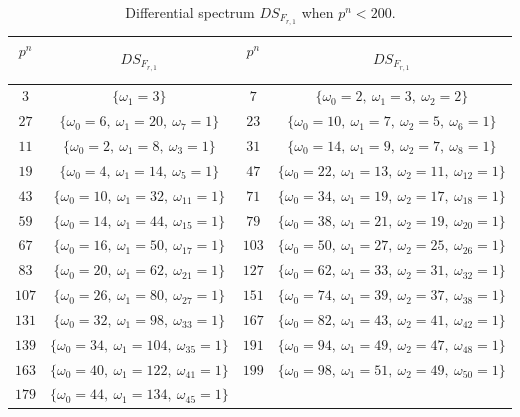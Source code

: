 \documentclass[11pt]{article}
\numberwithin{theorem}{section}
\begin{document}
\begin{table}
	\begin{center}
	\begin{tabular}{cc|cc}
		\hline $p^n$\ & $DS_{F_{r,1}}$ &  $p^n$\ & $DS_{F_{r,1}}$ \\
		\hline $3$ & $\{ \omega_1 = 3 \}$ & $7$ & $\{\omega_0 = 2,\ \omega_1 = 3,\ \omega_2 = 2 \}$\\
		$27$ & $\{\omega_0 = 6,\ \omega_1 = 20,\ \omega_7 = 1 \}$ & $23$ & $\{\omega_0 = 10,\ \omega_1 = 7,\ \omega_2 = 5,\ \omega_{6}=1 \}$ \\
		$11$ & $\{\omega_0 = 2,\ \omega_1 = 8,\ \omega_3 = 1 \}$ & $31$ & $\{\omega_0 = 14,\ \omega_1 = 9,\ \omega_2 = 7,\ \omega_{8}=1 \}$ \\
		$19$ & $\{\omega_0 = 4,\ \omega_1 = 14,\ \omega_5 = 1 \}$ & $47$ & $\{\omega_0 = 22,\ \omega_1 = 13,\ \omega_2 = 11,\ \omega_{12}=1 \}$ \\
		$43$ & $\{\omega_0 = 10,\ \omega_1 = 32,\ \omega_{11} = 1 \}$ & $71$ & $\{\omega_0 = 34,\ \omega_1 = 19,\ \omega_2 = 17,\ \omega_{18}=1 \}$ \\
		$59$ & $\{\omega_0 = 14,\ \omega_1 = 44,\ \omega_{15} = 1 \}$ & $79$ & $\{\omega_0 = 38,\ \omega_1 = 21,\ \omega_2 = 19,\ \omega_{20}=1 \}$ \\
		$67$ & $\{\omega_0 = 16,\ \omega_1 = 50,\ \omega_{17} = 1 \}$ & $103$ & $\{\omega_0 = 50,\ \omega_1 = 27,\ \omega_2 = 25,\ \omega_{26}=1 \}$ \\
		$83$ & $\{\omega_0 = 20,\ \omega_1 = 62,\ \omega_{21} = 1 \}$ & $127$ & $\{\omega_0 = 62,\ \omega_1 = 33,\ \omega_2 = 31,\ \omega_{32}=1 \}$ \\
		$107$ & $\{\omega_0 = 26,\ \omega_1 = 80,\ \omega_{27} = 1 \}$ & $151$ & $\{\omega_0 = 74,\ \omega_1 = 39,\ \omega_2 = 37,\ \omega_{38}=1 \}$ \\
		$131$ & $\{\omega_0 = 32,\ \omega_1 = 98,\ \omega_{33} = 1 \}$ & $167$ & $\{\omega_0 = 82,\ \omega_1 = 43,\ \omega_2 = 41,\ \omega_{42}=1 \}$ \\
		$139$ & $\{\omega_0 = 34,\ \omega_1 = 104,\ \omega_{35} = 1 \}$ & $191$ & $\{\omega_0 = 94,\ \omega_1 = 49,\ \omega_2 = 47,\ \omega_{48}=1 \}$ \\
		$163$ & $\{\omega_0 = 40,\ \omega_1 = 122,\ \omega_{41} = 1 \}$ & $199$ & $\{\omega_0 = 98,\ \omega_1 = 51,\ \omega_2 = 49,\ \omega_{50}=1 \}$ \\
		$179$ & $\{\omega_0 = 44,\ \omega_1 = 134,\ \omega_{45} = 1 \}$ & &  \\
		\hline
	\end{tabular}
	\caption{Differential spectrum $DS_{F_{r,1}}$ when $p^n < 200$.}\label{table_ds}
	\end{center}
\end{table}
\end{document}
